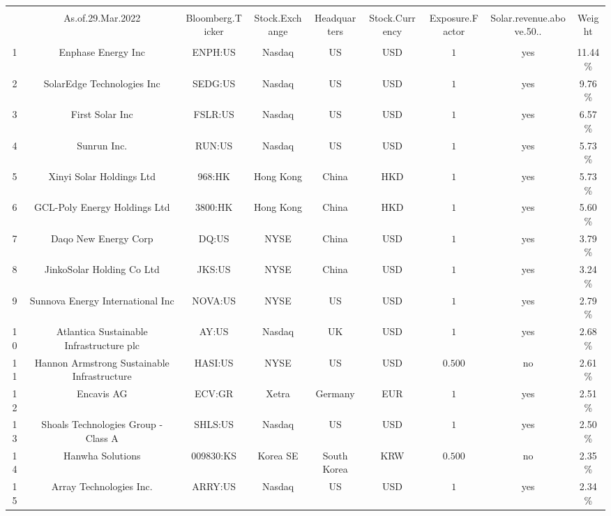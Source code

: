 \begin{table}[!htbp] \centering 
  \caption{} 
  \label{} 
\begin{tabular}{@{\extracolsep{5pt}} ccccccccc} 
\\[-1.8ex]\hline 
\hline \\[-1.8ex] 
 & As.of.29.Mar.2022 & Bloomberg.Ticker & Stock.Exchange & Headquarters & Stock.Currency & Exposure.Factor & Solar.revenue.above.50.. & Weight \\ 
\hline \\[-1.8ex] 
1 & Enphase Energy Inc & ENPH:US & Nasdaq & US & USD & $1$ & yes & 11.44\% \\ 
2 & SolarEdge Technologies Inc & SEDG:US & Nasdaq & US & USD & $1$ & yes & 9.76\% \\ 
3 & First Solar Inc & FSLR:US & Nasdaq & US & USD & $1$ & yes & 6.57\% \\ 
4 & Sunrun Inc. & RUN:US & Nasdaq & US & USD & $1$ & yes & 5.73\% \\ 
5 & Xinyi Solar Holdings Ltd & 968:HK & Hong Kong & China & HKD & $1$ & yes & 5.73\% \\ 
6 & GCL-Poly Energy Holdings Ltd & 3800:HK & Hong Kong & China & HKD & $1$ & yes & 5.60\% \\ 
7 & Daqo New Energy Corp & DQ:US & NYSE & China & USD & $1$ & yes & 3.79\% \\ 
8 & JinkoSolar Holding Co Ltd & JKS:US & NYSE & China & USD & $1$ & yes & 3.24\% \\ 
9 & Sunnova Energy International Inc & NOVA:US & NYSE & US & USD & $1$ & yes & 2.79\% \\ 
10 & Atlantica Sustainable Infrastructure plc & AY:US & Nasdaq & UK & USD & $1$ & yes & 2.68\% \\ 
11 & Hannon Armstrong Sustainable Infrastructure & HASI:US & NYSE & US & USD & $0.500$ & no & 2.61\% \\ 
12 & Encavis AG & ECV:GR & Xetra & Germany & EUR & $1$ & yes & 2.51\% \\ 
13 & Shoals Technologies Group - Class A & SHLS:US & Nasdaq & US & USD & $1$ & yes & 2.50\% \\ 
14 & Hanwha Solutions & 009830:KS & Korea SE & South Korea & KRW & $0.500$ & no & 2.35\% \\ 
15 & Array Technologies Inc. & ARRY:US & Nasdaq & US & USD & $1$ & yes & 2.34\% \\ 

\end{tabular}
\end{table}
